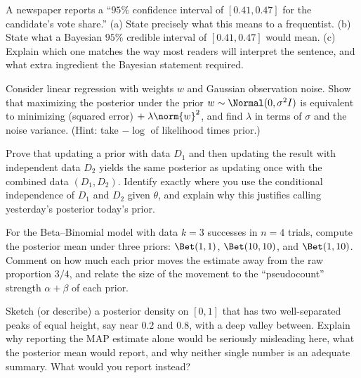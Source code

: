 \begin{exercise}
A newspaper reports a ``$95\%$ confidence interval of $[0.41, 0.47]$ for the candidate's
vote share.'' (a) State precisely what this means to a frequentist. (b) State what a
Bayesian $95\%$ credible interval of $[0.41,0.47]$ would mean. (c) Explain which one
matches the way most readers will interpret the sentence, and what extra ingredient the
Bayesian statement required.
\end{exercise}

\begin{exercise}
Consider linear regression with weights $w$ and Gaussian observation noise. Show that
maximizing the posterior under the prior $w\sim\Normal(0,\sigma^2 I)$ is equivalent to
minimizing (squared error) $+\;\lambda\norm{w}^2$, and find $\lambda$ in terms of $\sigma$
and the noise variance. (Hint: take $-\log$ of likelihood times prior.)
\end{exercise}

\begin{exercise}
Prove that updating a prior with data $D_1$ and then updating the result with independent
data $D_2$ yields the same posterior as updating once with the combined data $(D_1,D_2)$.
Identify exactly where you use the conditional independence of $D_1$ and $D_2$ given
$\theta$, and explain why this justifies calling yesterday's posterior today's prior.
\end{exercise}

\begin{exercise}
For the Beta--Binomial model with data $k=3$ successes in $n=4$ trials, compute the
posterior mean under three priors: $\Bet(1,1)$, $\Bet(10,10)$, and $\Bet(1,10)$. Comment on
how much each prior moves the estimate away from the raw proportion $3/4$, and relate the
size of the movement to the ``pseudocount'' strength $\alpha+\beta$ of each prior.
\end{exercise}

\begin{exercise}
Sketch (or describe) a posterior density on $[0,1]$ that has two well-separated peaks of
equal height, say near $0.2$ and $0.8$, with a deep valley between. Explain why reporting
the MAP estimate alone would be seriously misleading here, what the posterior mean would
report, and why neither single number is an adequate summary. What would you report
instead?
\end{exercise}
